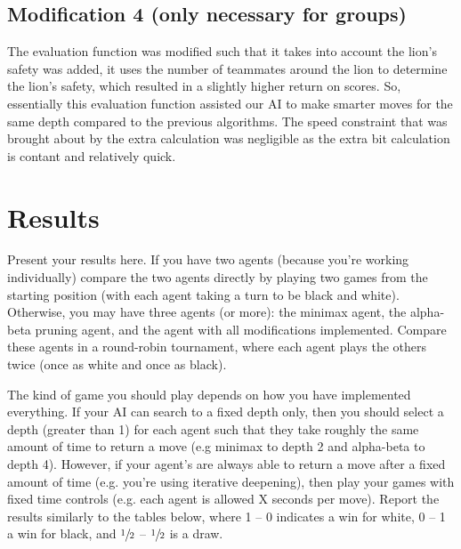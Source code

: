 \documentclass[twocolumn]{article}
\begin{document}
\subsection{Modification 4 (only necessary for groups)}

The evaluation function was modified such that it takes into account the lion's safety was added, it uses the number of teammates around the lion to determine the lion's safety, which resulted in a slightly higher return on scores. So, essentially this evaluation function assisted our AI to make smarter moves for the same depth compared to the previous algorithms. The speed constraint that was brought about by the extra calculation was negligible as the extra bit calculation is contant and relatively quick.

\section{Results}

Present your results here. If you have two agents (because you're working individually) compare the two agents directly by playing two games from the starting position (with each agent taking a turn to be black and white).
Otherwise, you may have three agents (or more): the minimax agent, the alpha-beta pruning agent, and the agent with all modifications implemented. Compare these agents in a round-robin tournament, where each agent plays the others twice (once as white and once as black).

The kind of game you should play depends on how you have implemented everything. If your AI can search to a fixed depth only, then you should select a depth (greater than 1) for each agent such that they take roughly the same amount of time to return a move (e.g minimax to depth 2 and alpha-beta to depth 4). However, if your agent's are always able to return a move after a fixed amount of time (e.g. you're using iterative deepening), then play your games with fixed time controls (e.g. each agent is allowed X seconds per move). Report the results similarly to the tables below, where 1 -- 0 indicates a win for white, 0 -- 1 a win for black, and $\sfrac{1}{2}$ -- $\sfrac{1}{2}$ is a draw.
\end{document}
